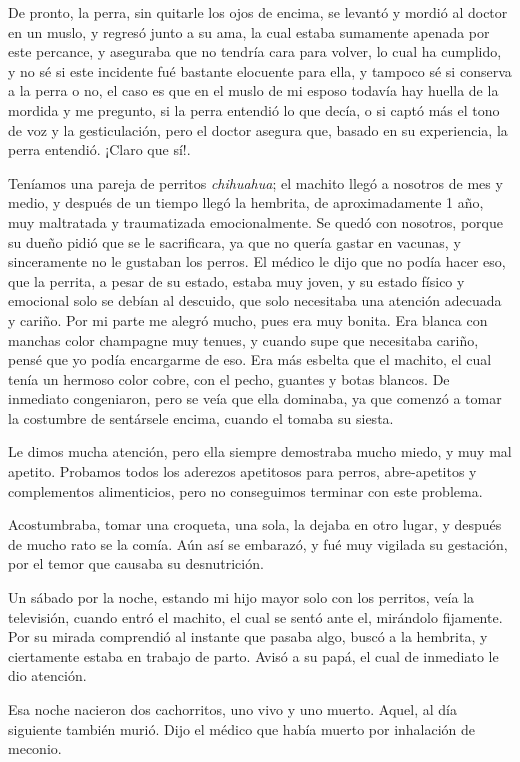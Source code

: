 \documentclass[letterpaper, 12pt]{book}
\begin{document}
De pronto, la perra, sin quitarle los ojos de encima, se levantó y mordió al doctor en un muslo, y regresó junto a su ama, la cual estaba sumamente apenada por este percance, y aseguraba que no tendría cara para volver, lo cual ha cumplido, y no sé si este incidente fué bastante elocuente para ella, y tampoco sé si conserva a la perra o no, el caso es que en el muslo de mi esposo todavía hay huella de la mordida y me pregunto, si la perra entendió lo que decía, o si captó más el tono de voz y la gesticulación, pero el doctor asegura que, basado en su experiencia, la perra entendió. ¡Claro que sí!.

Teníamos una pareja de perritos \textit{chihuahua}; el machito llegó a nosotros de mes y medio, y después de un tiempo llegó la hembrita, de aproximadamente 1 año, muy maltratada y traumatizada emocionalmente. Se quedó con nosotros, porque su dueño pidió que se le sacrificara, ya que no quería gastar en vacunas, y sinceramente no le gustaban los perros. El médico le dijo que no podía hacer eso, que la perrita, a pesar de su estado, estaba muy joven, y su estado físico y emocional solo se debían al descuido, que solo necesitaba una atención adecuada y cariño. Por mi parte me alegró mucho, pues era muy bonita. Era blanca con manchas color champagne muy tenues, y cuando supe que necesitaba cariño, pensé que yo podía encargarme de eso. Era más esbelta que el machito, el cual tenía un hermoso color cobre, con el pecho, guantes y botas blancos. De inmediato congeniaron, pero se veía que ella dominaba, ya que comenzó a tomar la costumbre de sentársele encima, cuando el tomaba su siesta. 

Le dimos mucha atención, pero ella siempre demostraba mucho miedo, y muy mal apetito. Probamos todos los aderezos apetitosos para perros, abre-apetitos y complementos alimenticios, pero no conseguimos terminar con este problema. 

Acostumbraba, tomar una croqueta, una sola, la dejaba en otro lugar, y después de mucho rato se la comía. Aún así se embarazó, y fué muy vigilada su gestación, por el temor que causaba su desnutrición.

Un sábado por la noche, estando mi hijo mayor solo con los perritos, veía la televisión, cuando entró el machito, el cual se sentó ante el, mirándolo fijamente. Por su mirada comprendió al instante que pasaba algo, buscó a la hembrita, y ciertamente estaba en trabajo de parto. Avisó a su papá, el cual de inmediato le dio atención. 

Esa noche nacieron dos cachorritos, uno vivo y uno muerto. Aquel, al día siguiente también murió. Dijo el médico que había muerto por inhalación de meconio. 
\end{document}
